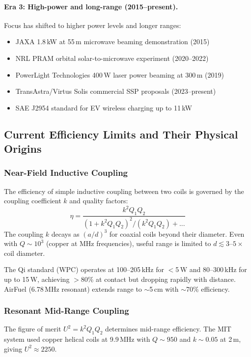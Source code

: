 \documentclass[11pt,a4paper]{article}
\begin{document}
\paragraph{Era 3: High-power and long-range (2015--present).}
Focus has shifted to higher power levels and longer ranges:
\begin{itemize}
\item JAXA 1.8\,kW at 55\,m microwave beaming demonstration (2015)
\item NRL PRAM orbital solar-to-microwave experiment (2020--2022)
\item PowerLight Technologies 400\,W laser power beaming at 300\,m (2019)
\item TransAstra/Virtus Solis commercial SSP proposals (2023--present)
\item SAE J2954 standard for EV wireless charging up to 11\,kW
\end{itemize}

\subsection{Current Efficiency Limits and Their Physical Origins}

\subsubsection{Near-Field Inductive Coupling}

The efficiency of simple inductive coupling between two coils
is governed by the coupling coefficient $k$ and quality factors:
\[
\eta = \frac{k^2 Q_1 Q_2}{(1 + k^2 Q_1 Q_2)^2/(k^2 Q_1 Q_2) + ...}
\]
The coupling $k$ decays as $(a/d)^3$ for coaxial coils beyond
their diameter. Even with $Q \sim 10^3$ (copper at MHz frequencies),
useful range is limited to $d \lesssim 3$--$5 \times$ coil diameter.

The Qi standard (WPC) operates at 100--205\,kHz for $<$5\,W and
80--300\,kHz for up to 15\,W, achieving $>$80\% at contact but
dropping rapidly with distance. AirFuel (6.78\,MHz resonant) extends
range to $\sim$5\,cm with $\sim$70\% efficiency.

\subsubsection{Resonant Mid-Range Coupling}

The figure of merit $U^2 = k^2 Q_1 Q_2$ determines mid-range
efficiency. The MIT system used copper helical coils at 9.9\,MHz
with $Q \sim 950$ and $k \sim 0.05$ at 2\,m, giving $U^2 \approx 2250$.
\end{document}
